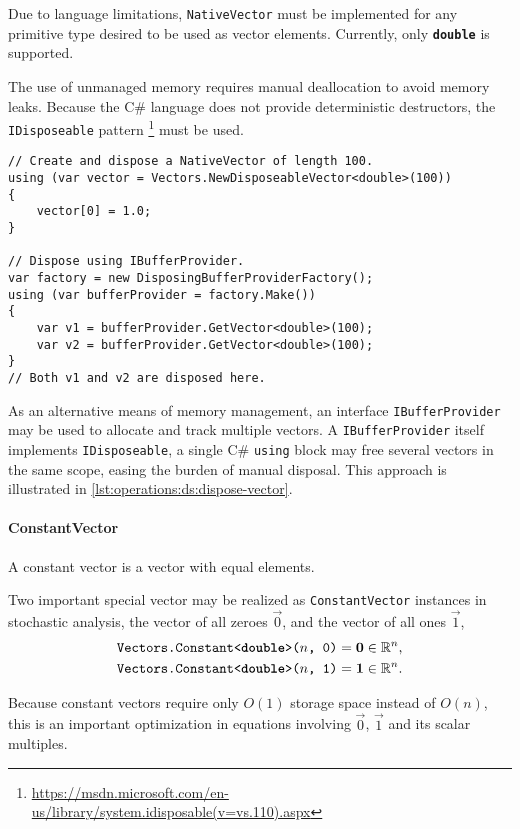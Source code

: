 Due to language limitations, \texttt{NativeVector} must be implemented
for any primitive type desired to be used as vector
elements. Currently, only \texttt{\textbf{double}} is supported.

The use of unmanaged memory requires manual deallocation to avoid
memory leaks. Because the C\# language does not provide deterministic
destructors, the \texttt{IDisposeable} pattern%
\footnote{\url{https://msdn.microsoft.com/en-us/library/system.idisposable(v=vs.110).aspx}}
must be used.

\begin{lstlisting}[float,caption={Manual memory management for
    \texttt{NativeVector}.},label=lst:operations:ds:dispose-vector]
// Create and dispose a NativeVector of length 100.
using (var vector = Vectors.NewDisposeableVector<double>(100))
{
	vector[0] = 1.0;
}

// Dispose using IBufferProvider.
var factory = new DisposingBufferProviderFactory();
using (var bufferProvider = factory.Make())
{
	var v1 = bufferProvider.GetVector<double>(100);
	var v2 = bufferProvider.GetVector<double>(100);
}
// Both v1 and v2 are disposed here.
\end{lstlisting}

As an alternative means of memory management, an interface
\texttt{IBufferProvider} may be used to allocate and track multiple
vectors. A \texttt{IBufferProvider} itself implements
\texttt{IDisposeable}, a single C\# \texttt{using} block may free
several vectors in the same scope, easing the burden of manual
disposal. This approach is illustrated in
\cref{lst:operations:ds:dispose-vector}.

\paragraph{ConstantVector}

A constant vector is a vector with equal elements.

Two important special vector may be realized as
\texttt{ConstantVector} instances in stochastic analysis, the vector
of all zeroes $\vec{0}$, and the vector of all ones $\vec{1}$,
\begin{align}
  \texttt{Vectors.Constant<\textbf{double}>($n$, 0)}
  &= \bm{\mathrm{0}} \in \mathbb{R}^n \text, \\
  \texttt{Vectors.Constant<\textbf{double}>($n$, 1)}
  &= \bm{\mathrm{1}} \in \mathbb{R}^n \text.
\end{align}

Because constant vectors require only $O(1)$ storage space instead of
$O(n)$, this is an important optimization in equations involving
$\vec{0}$, $\vec{1}$ and its scalar multiples.


